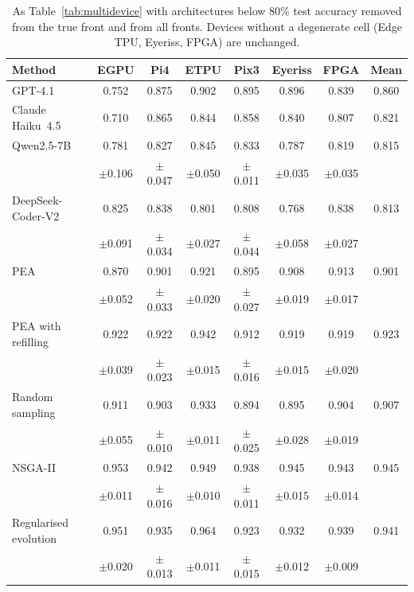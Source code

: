 \documentclass[pdflatex,sn-mathphys-ay]{sn-jnl}
\begin{document}
\begin{table}[h]\centering\footnotesize
\caption{As Table~\ref{tab:multidevice} with architectures below 80\% test accuracy removed from the true front and from all fronts. Devices without a degenerate cell (Edge TPU, Eyeriss, FPGA) are unchanged.}\label{tab:multidevicefloor}
\setlength{\tabcolsep}{2pt}
\begin{tabular}{lccccccc}
\toprule
Method & EGPU & Pi4 & ETPU & Pix3 & Eyeriss & FPGA & Mean \\
\midrule
GPT-4.1 & 0.752 & 0.875 & 0.902 & 0.895 & 0.896 & 0.839 & 0.860 \\
Claude Haiku~4.5 & 0.710 & 0.865 & 0.844 & 0.858 & 0.840 & 0.807 & 0.821 \\
Qwen2.5-7B & 0.781 & 0.827 & 0.845 & 0.833 & 0.787 & 0.819 & 0.815 \\
 & $\pm$0.106 & $\pm$0.047 & $\pm$0.050 & $\pm$0.011 & $\pm$0.035 & $\pm$0.035 &  \\
DeepSeek-Coder-V2 & 0.825 & 0.838 & 0.801 & 0.808 & 0.768 & 0.838 & 0.813 \\
 & $\pm$0.091 & $\pm$0.034 & $\pm$0.027 & $\pm$0.044 & $\pm$0.058 & $\pm$0.027 &  \\
\midrule
PEA & 0.870 & 0.901 & 0.921 & 0.895 & 0.908 & 0.913 & 0.901 \\
 & $\pm$0.052 & $\pm$0.033 & $\pm$0.020 & $\pm$0.027 & $\pm$0.019 & $\pm$0.017 &  \\
PEA with refilling & 0.922 & 0.922 & 0.942 & 0.912 & 0.919 & 0.919 & 0.923 \\
 & $\pm$0.039 & $\pm$0.023 & $\pm$0.015 & $\pm$0.016 & $\pm$0.015 & $\pm$0.020 &  \\
Random sampling & 0.911 & 0.903 & 0.933 & 0.894 & 0.895 & 0.904 & 0.907 \\
 & $\pm$0.055 & $\pm$0.010 & $\pm$0.011 & $\pm$0.025 & $\pm$0.028 & $\pm$0.019 &  \\
NSGA-II & 0.953 & 0.942 & 0.949 & 0.938 & 0.945 & 0.943 & 0.945 \\
 & $\pm$0.011 & $\pm$0.016 & $\pm$0.010 & $\pm$0.011 & $\pm$0.015 & $\pm$0.014 &  \\
Regularised evolution & 0.951 & 0.935 & 0.964 & 0.923 & 0.932 & 0.939 & 0.941 \\
 & $\pm$0.020 & $\pm$0.013 & $\pm$0.011 & $\pm$0.015 & $\pm$0.012 & $\pm$0.009 &  \\
\bottomrule
\end{tabular}
\end{table}
\end{document}
